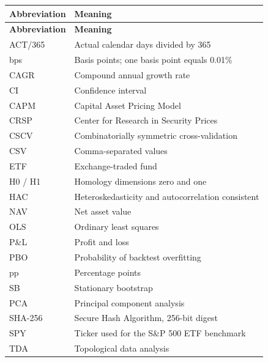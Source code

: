 \documentclass[12pt,a4paper,oneside]{article}
\begin{document}
\begingroup
\setcounter{table}{0}
\fontsize{10}{12.5}\selectfont
\renewcommand{\arraystretch}{1.12}
\setlength{\aboverulesep}{1pt}\setlength{\belowrulesep}{1pt}
\begin{longtable}{P{0.230000\dimexpr{}\tabcolsep\relax}P{0.770000\dimexpr{}\tabcolsep\relax}}
\toprule
{} \textbf{Abbreviation} & \textbf{Meaning} \\ \midrule
\endfirsthead
\toprule
{} \textbf{Abbreviation} & \textbf{Meaning} \\ \midrule
\endhead
\endfoot
\endlastfoot
ACT/365 & Actual calendar days divided by 365 \\
\midrule[0.2pt]
bps & Basis points; one basis point equals 0.01\% \\
\midrule[0.2pt]
CAGR & Compound annual growth rate \\
\midrule[0.2pt]
CI & Confidence interval \\
\midrule[0.2pt]
CAPM & Capital Asset Pricing Model \\
\midrule[0.2pt]
CRSP & Center for Research in Security Prices \\
\midrule[0.2pt]
CSCV & Combinatorially symmetric cross-validation \\
\midrule[0.2pt]
CSV & Comma-separated values \\
\midrule[0.2pt]
ETF & Exchange-traded fund \\
\midrule[0.2pt]
H0 / H1 & Homology dimensions zero and one \\
\midrule[0.2pt]
HAC & Heteroskedasticity and autocorrelation consistent \\
\midrule[0.2pt]
NAV & Net asset value \\
\midrule[0.2pt]
OLS & Ordinary least squares \\
\midrule[0.2pt]
P\&L & Profit and loss \\
\midrule[0.2pt]
PBO & Probability of backtest overfitting \\
\midrule[0.2pt]
pp & Percentage points \\
\midrule[0.2pt]
SB & Stationary bootstrap \\
\midrule[0.2pt]
PCA & Principal component analysis \\
\midrule[0.2pt]
SHA-256 & Secure Hash Algorithm, 256-bit digest \\
\midrule[0.2pt]
SPY & Ticker used for the S\&P 500 ETF benchmark \\
\midrule[0.2pt]
TDA & Topological data analysis \\

\end{longtable}
\end{document}

